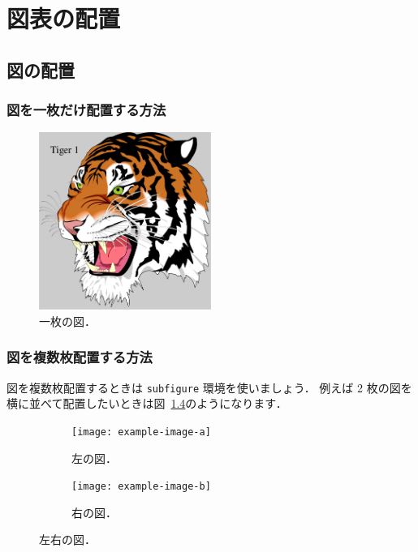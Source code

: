 \chapter{図表の配置}
\label{ch:figure_table}



\section{図の配置}
\label{sec:figure}


\subsection{図を一枚だけ配置する方法}
\label{ssec:figure_sigle}

\begin{figure}
    \centering
    \includegraphics[width=0.5\textwidth]{figure/tiger1.pdf}
    \caption{一枚の図．}
    \label{fig:example}
\end{figure}


\subsection{図を複数枚配置する方法}
\label{ssec:multiple}

図を複数枚配置するときは \verb|subfigure| 環境を使いましょう．
例えば 2 枚の図を横に並べて配置したいときは図~\ref{fig:two_subfigures}のようになります．


\begin{figure}[tp]
    \centering
    \begin{subfigure}{0.45\textwidth}
        \centering
        \texttt{[image: example-image-a]}
        \caption{左の図．}
        \label{fig:example_a}
    \end{subfigure}
    \hfill %
    \begin{subfigure}{0.45\textwidth}
        \centering
        \texttt{[image: example-image-b]}
        \caption{右の図．}
        \label{fig:example_b}
    \end{subfigure}
    \caption{左右の図．}
    \label{fig:two_subfigures}
\end{figure}

